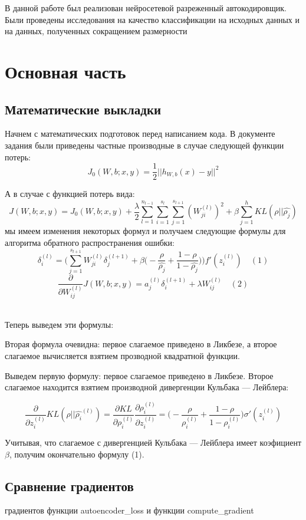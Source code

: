 \documentclass[12pt, a4paper]{article}
\begin{document}
		В данной работе был реализован нейросетевой разреженный автокодировщик. Были проведены исследования на качество классификации на исходных данных и на данных, полученных сокращением размерности

	\newpage
	\section{Основная часть}
		\subsection{Математические выкладки}
			Начнем с математических подготовок перед написанием кода. В документе задания были приведены частные производные в случае следующей функции потерь: $$J_0(W, b; x, y) = \frac{1}{2} ||h_{W,b}(x) - y || ^ 2$$

			А в случае с функцией потерь вида: $$J(W, b; x, y) = J_0(W, b; x, y) + \frac{\lambda}{2} \sum\limits_{l=1}^{n_{l-1}} \sum\limits_{i=1}^{s_l} \sum\limits_{j=1}^{s_{l+1}} (W_{ji} ^ {(l)}) ^ 2 + \beta \sum\limits_{j=1}^h KL(\rho || \hat{\rho_j})$$
			мы имеем изменения некоторых формул и получаем следующие формулы для алгоритма обратного распространения ошибки:
			$$\delta_i^{(l)} = \bigg(
									\sum\limits_{j=1}^{s_{l+1}} W_{ji}^{(l)}\delta_j^{(l+1)} +
									\beta \Big(-\frac{\rho}{\hat{\rho_j}} + \frac{1 - \rho}{1 - \hat{\rho_j}}\Big)
							   \bigg)f'(z_i^{(l)}) \quad (1)$$ 
			$$\frac{\partial }{\partial W_{ij}^{(l)}} J(W, b; x, y) = a_j^{(l)} \delta_i^{(l+1)} + \lambda W_{ij}^{(l)} \quad (2)$$\

			Теперь выведем эти формулы:

			Вторая формула очевидна: первое слагаемое приведено в Ликбезе, а второе слагаемое вычисляется взятием прозводной квадратной функции.

			Выведем первую формулу: первое слагаемое приведено в Ликбезе. Второе слагаемое находится взятием производной дивергенции Кульбака — Лейблера:

			$$\frac{\partial}{\partial z_i^{(l)}} KL(\rho || \hat{\rho_i}^{(l)}) = \frac{\partial KL}{\partial \rho_i^{(l)}} \frac{\partial \rho_i^{(l)}}{\partial z_i^{(l)}} = \Big(-\frac{\rho}{\rho_i^{(l)}} + \frac{1 - \rho}{1 - \rho_i^{(l)}}\Big) \sigma '(z_i^{(l)})$$

			Учитывая, что слагаемое с дивергенцией Кульбака — Лейблера имеет коэфициент $\beta$, получим окончательно формулу (1).

		\newpage
		\subsection{Сравнение градиентов}
			\begin{center}{ градиентов функции autoencoder\_loss и функции compute\_gradient}\end{center}
\end{document}
